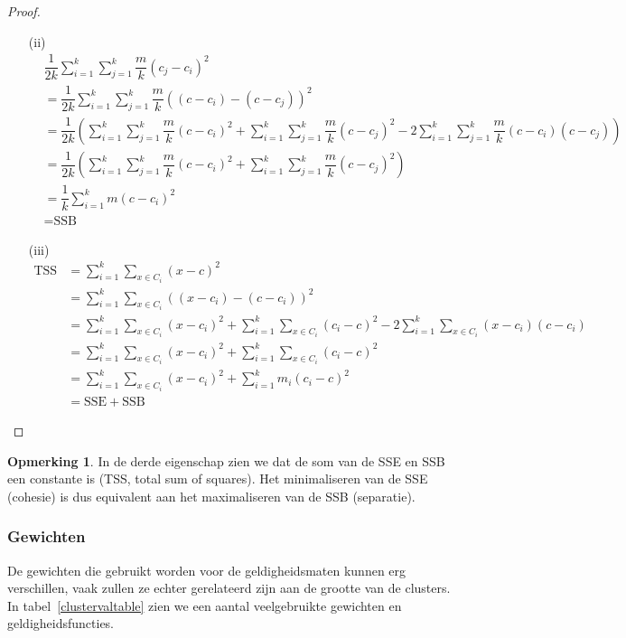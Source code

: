 \documentclass[a4paper,12pt]{article}
\theoremstyle{definition}
\newtheorem{opm}{Opmerking}[subsection]
\newcommand{\SSE}{\text{SSE}}
\newcommand{\SSB}{\text{SSB}}
\newcommand{\TSS}{\text{TSS}}
\begin{document}
\begin{proof}
\begin{itemize}
  \item[(ii)]
  \begin{align*}
  &\dfrac{1}{2k}\sum\limits_{i=1}^k\sum\limits_{j=1}^k\dfrac{m}{k}(c_j-c_i)^2\\
  &= \dfrac{1}{2k}\sum\limits_{i=1}^k\sum\limits_{j=1}^k\dfrac{m}{k}((c-c_i)-(c-c_j))^2\\
  &= \dfrac{1}{2k}\left(\sum\limits_{i=1}^k\sum\limits_{j=1}^k\dfrac{m}{k}(c-c_i)^2 + \sum\limits_{i=1}^k\sum\limits_{j=1}^k\dfrac{m}{k}(c-c_j)^2
  - 2\sum\limits_{i=1}^k\sum\limits_{j=1}^k\dfrac{m}{k}(c-c_i)(c-c_j)\right)\\
  &= \dfrac{1}{2k}\left(\sum\limits_{i=1}^k\sum\limits_{j=1}^k\dfrac{m}{k}(c-c_i)^2 + \sum\limits_{i=1}^k\sum\limits_{j=1}^k\dfrac{m}{k}(c-c_j)^2\right)\\
  &= \dfrac{1}{k}\sum\limits_{i=1}^km(c-c_i)^2\\
  &= \SSB
  \end{align*}
  \item[(iii)]
  \begin{align*}
  \TSS &= \sum\limits_{i=1}^k\sum\limits_{x\in C_i}(x-c)^2\\
  &= \sum\limits_{i=1}^k\sum\limits_{x\in C_i}((x-c_i)-(c-c_i))^2\\
  &= \sum\limits_{i=1}^k\sum\limits_{x\in C_i}(x-c_i)^2+\sum\limits_{i=1}^k\sum\limits_{x\in C_i}(c_i-c)^2 - 2\sum\limits_{i=1}^k\sum\limits_{x\in C_i}(x-c_i)(c-c_i)\\
  &= \sum\limits_{i=1}^k\sum\limits_{x\in C_i}(x-c_i)^2+\sum\limits_{i=1}^k\sum\limits_{x\in C_i}(c_i-c)^2\\
  &= \sum\limits_{i=1}^k\sum\limits_{x\in C_i}(x-c_i)^2+\sum\limits_{i=1}^km_i(c_i-c)^2\\
  &= \SSE + \SSB
  \end{align*}
 \end{itemize}
\end{proof}





\begin{opm}
 In de derde eigenschap zien we dat de som van de SSE en SSB een constante is
 (TSS, total sum of squares). Het minimaliseren van de SSE (cohesie) is dus equivalent
 aan het maximaliseren van de SSB (separatie).
\end{opm}



\subsubsection*{Gewichten}
De gewichten die gebruikt worden voor de geldigheidsmaten kunnen erg verschillen,
vaak zullen ze echter gerelateerd zijn aan de grootte van de clusters.
In tabel~\ref{clustervaltable} zien we een aantal veelgebruikte gewichten en
geldigheidsfuncties.
\end{document}
